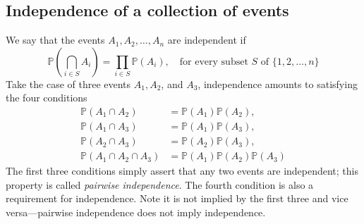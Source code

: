 \documentclass{report}
\begin{document}
\subsection{Independence of a collection of events}
We say that the events $A_1,A_2,\ldots,A_n$ are independent if
\begin{equation*}
\mathbb P\left(\bigcap_{i\in S}A_i\right)=\prod_{i\in S}\mathbb P(A_i),\quad\text{for every subset $S$ of $\{1,2,\ldots,n\}$}
\end{equation*}
Take the case of three events $A_1,A_2$, and $A_3$, independence amounts to satisfying the four conditions
\begin{align*}
\mathbb P(A_1\cap A_2)&=\mathbb P(A_1)\mathbb P(A_2),\\
\mathbb P(A_1\cap A_3)&=\mathbb P(A_1)\mathbb P(A_3),\\
\mathbb P(A_2\cap A_3)&=\mathbb P(A_2)\mathbb P(A_3),\\
\mathbb P(A_1\cap A_2\cap A_3)&=\mathbb P(A_1)\mathbb P(A_2)\mathbb P(A_3)
\end{align*}
The first three conditions simply assert that any two events are independent; this property is called \textit{pairwise independence}. The fourth condition is also a requirement for independence. 
Note it is not implied by the first three and vice versa---pairwise independence does not imply independence.
\newpage
\end{document}
